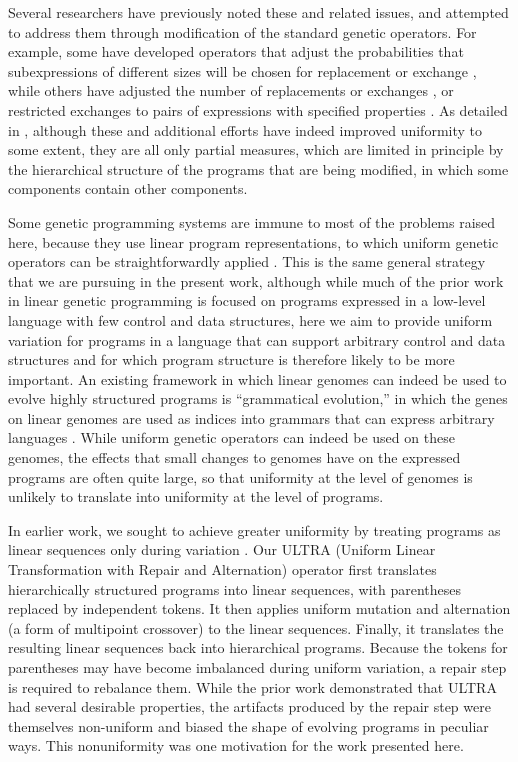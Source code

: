 Several researchers have previously noted these and related issues, and attempted to address them through modification of the standard genetic operators. For example, some have developed operators that adjust the probabilities that subexpressions of different sizes will be chosen for replacement or exchange \citep{koza:book,Helmuth:2011:GECCOcomp}, while others have adjusted the number of replacements or exchanges \citep{vanbelle:2002:EuroGP:NOERROR}, or restricted exchanges to pairs of expressions with specified properties \citep{page:CSRP-98-20,poli:1998:local,poli:2000:22par}. As detailed in \citep{Spector:2013:GPTP}, although these and additional efforts have indeed improved uniformity to some extent, they are all only partial measures, which are limited in principle by the hierarchical structure of the programs that are being modified, in which some components contain other components.

Some genetic programming systems are immune to most of the problems raised here, because they use linear program representations, to which uniform genetic operators can be straightforwardly applied \citep{journals/ijait/OlteanGDM09}. This is the same general strategy that we are pursuing in the present work, although while much of the prior work in linear genetic programming is focused on programs expressed in a low-level language with few control and data structures, here we aim to provide uniform variation for programs in a language that can support arbitrary control and data structures and for which program structure is therefore likely to be more important. An existing framework in which linear genomes can indeed be used to evolve highly structured programs is ``grammatical evolution,'' in which the genes on linear genomes are used as indices into grammars that can express arbitrary languages \citep{ryan:1998:geepal}. While uniform genetic operators can indeed be used on these genomes, the effects that small changes to genomes have on the expressed programs are often quite large, so that uniformity at the level of genomes is unlikely to translate into uniformity at the level of programs.

In earlier work, we sought to achieve greater uniformity by treating programs as linear sequences only during variation \citep{Spector:2013:GPTP}. Our ULTRA (Uniform Linear Transformation with Repair and Alternation) operator first translates hierarchically structured programs into linear sequences, with parentheses replaced by independent tokens. It then applies uniform mutation and alternation (a form of multipoint crossover) to the linear sequences. Finally, it translates the resulting linear sequences back into hierarchical programs. Because the tokens for parentheses may have become imbalanced during uniform variation, a repair step is required to rebalance them. While the prior work demonstrated that ULTRA had several desirable properties, the artifacts produced by the repair step were themselves non-uniform and biased the shape of evolving programs in peculiar ways. This nonuniformity was one motivation for the work presented here.

